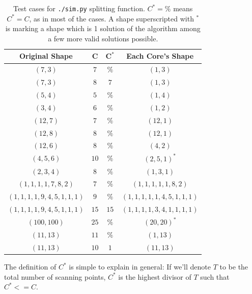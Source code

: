\begin{table}
  \centering
  \begin{tabular}{cccc}
    \toprule
    \textbf{Original Shape} & $\mathbf{C}$ & $\mathbf{C^*}$ & \textbf{Each Core's Shape} \\
    \midrule
    $(7, 3)$                         & $7$  & $\%$ & $(1, 3)$ \\
    $(7, 3)$                         & $8$  & $7$  & $(1, 3)$ \\
    $(5, 4)$                         & $5$  & $\%$ & $(1, 4)$ \\
    $(3, 4)$                         & $6$  & $\%$ & $(1, 2)$ \\
    $(12, 7)$                        & $7$  & $\%$ & $(12, 1)$ \\
    $(12, 8)$                        & $8$  & $\%$ & $(12, 1)$ \\
    $(12, 6)$                        & $8$  & $\%$ & $(4, 2)$ \\
    $(4, 5, 6)$                      & $10$ & $\%$ & $(2, 5, 1)^*$ \\
    $(2, 3, 4)$                      & $8$  & $\%$ & $(1, 3, 1)$ \\
    $(1, 1, 1, 1, 7, 8, 2)$          & $7$  & $\%$ & $(1, 1, 1, 1, 1, 8, 2)$ \\
    $(1, 1, 1, 1, 9, 4, 5, 1, 1, 1)$ & $9$  & $\%$ & $(1, 1, 1, 1, 1, 4, 5, 1, 1, 1)$ \\
    $(1, 1, 1, 1, 9, 4, 5, 1, 1, 1)$ & $15$ & $15$ & $(1, 1, 1, 1, 3, 4, 1, 1, 1, 1)$ \\
    $(100, 100)$                     & $25$ & $\%$ & $(20, 20)^*$ \\
    $(11, 13)$                       & $11$ & $\%$ & $(1, 13)$ \\
    $(11, 13)$                       & $10$ & $1$  & $(11, 13)$ \\
    \bottomrule
  \end{tabular}
  \caption{Test cases for \texttt{./sim.py} splitting function. $C^* = \%$ means $C^* = C$, as in most of the cases. A shape superscripted with ${}^*$ is marking a shape which is 1 solution of the algorithm among a few more valid solutions possible.}
  \label{tbl:--cores-splitting-examples}
\end{table}

The definition of $C^*$ is simple to explain in general: If we'll denote $T$ to be the total number of scanning points, $C^*$ is the highest divisor of $T$ such that $C^* <= C$.

